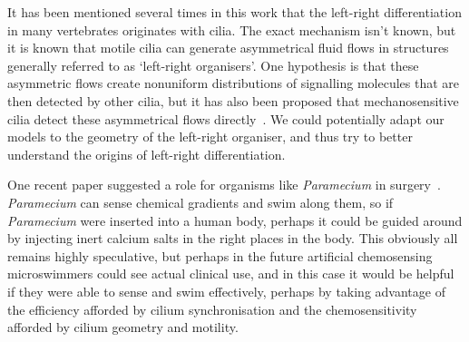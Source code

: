 
It has been mentioned several times in this work that the left-right differentiation in many vertebrates originates with cilia. The exact mechanism isn't known, but it is known that motile cilia can generate asymmetrical fluid flows in structures generally referred to as `left-right organisers'. One hypothesis is that these asymmetric flows create nonuniform distributions of signalling molecules that are then detected by other cilia, but it has also been proposed that mechanosensitive cilia detect these asymmetrical flows directly~. We could potentially adapt our models to the geometry of the left-right organiser, and thus try to better understand the origins of left-right differentiation.

One recent paper suggested a role for organisms like \textit{Paramecium} in surgery~. \textit{Paramecium} can sense chemical gradients and swim along them, so if \textit{Paramecium} were inserted into a human body, perhaps it could be guided around by injecting inert calcium salts in the right places in the body. This obviously all remains highly speculative, but perhaps in the future artificial chemosensing microswimmers could see actual clinical use, and in this case it would be helpful if they were able to sense and swim effectively, perhaps by taking advantage of the efficiency afforded by cilium synchronisation and the chemosensitivity afforded by cilium geometry and motility.


























